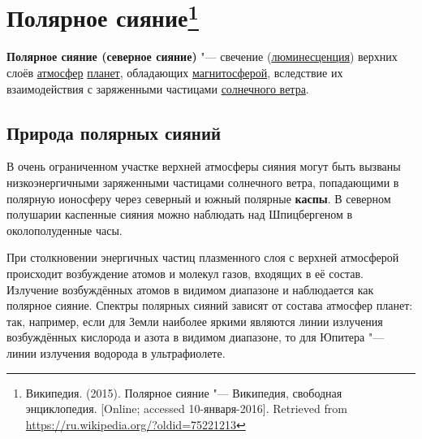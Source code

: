 \documentclass[a4paper,14pt]{article}
\theoremstyle{plain} %
\theoremstyle{definition} %
\theoremstyle{remark} %
\begin{document}

\section*{Полярное сияние\footnote{Википедия. (2015). Полярное сияние "--- Википедия, свободная энциклопедия. [Online; accessed 10-января-2016]. Retrieved from \url{https://ru.wikipedia.org/?oldid=75221213}}}

\textbf{Полярное сияние (северное сияние)} "--- свечение (\href{https://ru.wikipedia.org/wiki/%D0%9B%D1%8E%D0%BC%D0%B8%D0%BD%D0%B5%D1%81%D1%86%D0%B5%D0%BD%D1%86%D0%B8%D1%8F}{люминесценция})
верхних слоёв \href{https://ru.wikipedia.org/wiki/%D0%90%D1%82%D0%BC%D0%BE%D1%81%D1%84%D0%B5%D1%80%D0%B0}{атмосфер}
\href{https://ru.wikipedia.org/wiki/%D0%9F%D0%BB%D0%B0%D0%BD%D0%B5%D1%82%D0%B0}{планет}, обладающих \href{https://ru.wikipedia.org/wiki/%D0%9C%D0%B0%D0%B3%D0%BD%D0%B8%D1%82%D0%BE%D1%81%D1%84%D0%B5%D1%80%D0%B0}{магнитосферой}, вследствие
их взаимодействия с заряженными частицами \href{https://ru.wikipedia.org/wiki/%D0%A1%D0%BE%D0%BB%D0%BD%D0%B5%D1%87%D0%BD%D1%8B%D0%B9_%D0%B2%D0%B5%D1%82%D0%B5%D1%80}{солнечного ветра}.


\tableofcontents

\subsection{Природа полярных сияний}

В очень ограниченном участке верхней атмосферы сияния могут быть
вызваны низкоэнергичными заряженными частицами солнечного ветра,
попадающими в полярную ионосферу через северный и южный полярные \textbf{каспы}. В северном полушарии каспенные сияния можно наблюдать
над Шпицбергеном в околополуденные часы.

При столкновении энергичных частиц плазменного слоя с верхней
атмосферой происходит возбуждение атомов и молекул газов, входящих
в её состав. Излучение возбуждённых атомов в видимом диапазоне и
наблюдается как полярное сияние. Спектры полярных сияний зависят
от состава атмосфер планет: так, например, если для Земли наиболее
яркими являются линии излучения возбуждённых кислорода и азота в
видимом диапазоне, то для Юпитера "--- линии излучения водорода в
ультрафиолете.
\end{document}
